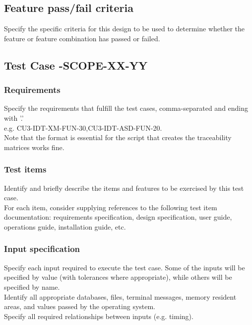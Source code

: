 \documentclass[DM,lsstdraft,STS,toc]{lsstdoc}
\begin{document}
\subsection{Feature pass/fail criteria \label{sect:passfail}}
Specify the specific criteria for this design to be used to determine whether the feature or feature combination has passed or failed.





\subsection{Test Case \product-SCOPE-XX-YY \label{sect:testcaseid}}

\subsubsection{Requirements \label{sect:reqs}}
Specify the requirements that fulfill the test cases, comma-separated and ending with '.'\\
e.g. CU3-IDT-XM-FUN-30,CU3-IDT-ASD-FUN-20.\\
Note that the format is essential for the script that creates the traceability matrices works fine.

\subsubsection{Test items \label{sect:tcitems}}
Identify and briefly describe the items and features to be exercised by this test case.\\
For each item, consider supplying references to the following test item documentation: requirements specification, design
specification, user guide, operations guide, installation guide, etc.

\subsubsection{Input specification \label{sect:tcinput}}
Specify each input required to execute the test case. Some of the inputs will be specified by value (with tolerances where
appropriate), while others will be specified by name.\\
Identify all appropriate databases, files, terminal messages, memory resident areas, and values passed by the operating system.\\
Specify all required relationships between inputs (e.g. timing).
\end{document}
